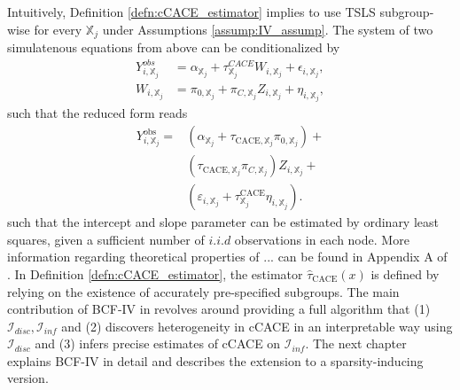 Intuitively, Definition \ref{defn:cCACE_estimator} implies to use TSLS subgroup-wise for every $\mathbb{X}_j$ under Assumptions \ref{assump:IV_assump}. The system of two simulatenous equations from above can be conditionalized by 
\begin{align*}
   Y_{i, \mathbb{X}_j}^{obs} &= \alpha_{\mathbb{X}_j} + \tau_{\mathbb{X}_j}^{CACE} W_{i, \mathbb{X}_j} + \epsilon_{i, \mathbb{X}_j}, \\
   W_{i, \mathbb{X}_j} &= \pi_{0, \mathbb{X}_j} + \pi_{C, \mathbb{X}_j} Z_{i, \mathbb{X}_j} + \eta_{i, \mathbb{X}_j},
\end{align*}
such that the reduced form reads 
\begin{align*}
   Y_{i,\mathbb{X}_j}^{\text{obs}} = &\left( \alpha_{\mathbb{X}_j} +
    \tau_{\text{CACE},\mathbb{X}_j} \pi_{0,\mathbb{X}_j} \right) + \\
     &\left( \tau_{\text{CACE},\mathbb{X}_j} \pi_{C,\mathbb{X}_j} \right) Z_{i,\mathbb{X}_j} + \\
     &\left( \varepsilon_{i,\mathbb{X}_j} + \tau^{\text{CACE}}_{\mathbb{X}_j} \eta_{i,\mathbb{X}_j} \right).
\end{align*}
such that the intercept and slope parameter can be estimated by ordinary least squares, given a sufficient number of $i.i.d$ observations in each node. More information regarding theoretical properties of ... can be found in Appendix A of \cite{bargagli-stoffi_heterogeneous_2022}. In Definition \ref{defn:cCACE_estimator}, the estimator $\widehat\tau_{\text{CACE}}(x)$ is defined by relying on the existence of accurately pre-specified subgroups. The main contribution of BCF-IV in \cite{bargagli-stoffi_heterogeneous_2022} revolves around providing a full algorithm that (1) $\mathcal{I}_{disc}, \mathcal{I}_{inf}$ and (2) discovers heterogeneity in cCACE in an interpretable way using $\mathcal{I}_{disc}$ and (3) infers precise estimates of cCACE on $\mathcal{I}_{inf}$. The next chapter explains BCF-IV in detail and describes the extension to a sparsity-inducing version.




